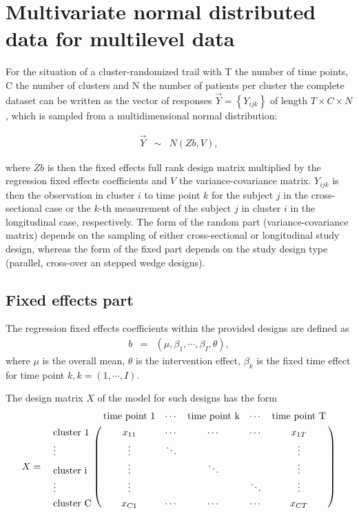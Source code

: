\documentclass{article}
\begin{document}
\section{Multivariate normal distributed data for multilevel data}

For the situation of a cluster-randomized trail with T the number of time points, 
C the number of clusters and N the number of patients per cluster 
the complete dataset can be written as the vector of responses $\overrightarrow{Y} = \left\{Y_{ijk}\right\}$ 
of length $T \times C\times N$, which is sampled from a multidimensional normal distribution:

\begin{eqnarray*}
 \overrightarrow{Y}&\sim& N\left(Zb, V\right),
\end{eqnarray*}

where $Zb$ is then the fixed effects full rank design matrix multiplied by the regression fixed effects coefficients and $V$ the variance-covariance matrix. 
$Y_{ijk}$ is then the observation in cluster $i$ to time point $k$ for the subject $j$ in the cross-sectional case or the $k$-th measurement of the subject $j$ in cluster $i$ in the longitudinal case, respectively. 
The form of the random part (variance-covariance matrix) depends on the sampling of either cross-sectional or longitudinal study design, whereas the form of the fixed part depends on the study design type (parallel, cross-over an stepped wedge designs). 


\subsection{Fixed effects part}

The regression fixed effects coefficients within the provided designs are defined as
\begin{eqnarray*}
  b &=& \left(\mu, \beta_1, \cdots, \beta_I, \theta \right), 
\end{eqnarray*}
where
$\mu$ is the overall mean, $\theta$ is the intervention effect, $\beta_k$ is the fixed time effect for time point $k, k=\left(1, \cdots, I\right)$.


The design matrix $X$ of the model for such designs has the form
\begin{eqnarray*}
  X &=&  \bordermatrix{
  					& \textrm{time point 1}	& \cdots	& \textrm{time point k}   & \cdots	   & \textrm{time point  T}  \cr
\textrm{cluster 1} 	& x_{11}&\cdots	&\cdots &\cdots & x_{1T} \cr
\vdots 				&\vdots &\ddots	&  		&  		& \vdots \cr
\textrm{cluster i}	&\vdots &		&\ddots &  		& \vdots\cr
\vdots 				&\vdots &		&  		&\ddots & \vdots\cr
\textrm{cluster C} 	& x_{C1} &\cdots	&\cdots &\cdots & x_{CT} \cr
}
\end{eqnarray*}
\end{document}
